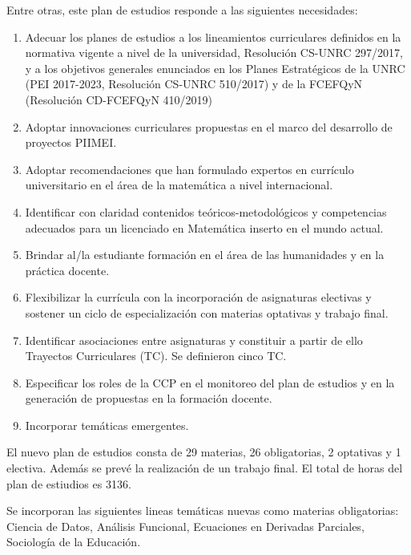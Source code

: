 \documentclass[a4paper, 12pt]{article}
\begin{document}
Entre otras, este plan de estudios responde a las siguientes necesidades:

\begin{enumerate}
 \item Adecuar los planes de estudios a los  lineamientos curriculares definidos en la normativa vigente a nivel de la universidad, Resolución CS-UNRC 297/2017, y a los objetivos generales enunciados en   los Planes Estratégicos de la UNRC (PEI 2017-2023, Resolución CS-UNRC 510/2017) y de la FCEFQyN (Resolución CD-FCEFQyN 410/2019)
 \item Adoptar innovaciones curriculares propuestas en el marco del desarrollo de proyectos PIIMEI.

 \item Adoptar recomendaciones que han formulado expertos en currículo universitario en el área de la matemática a nivel internacional.
 
 \item Identificar con claridad  contenidos teóricos-metodológicos y  competencias  adecuados para un  licenciado en Matemática inserto en el mundo actual.
 
 \item Brindar al/la estudiante formación en el área de las humanidades y en la práctica docente.
 
 \item Flexibilizar la currícula con la incorporación de asignaturas electivas y sostener un ciclo de especialización con materias optativas y trabajo final.
 
 \item Identificar asociaciones entre asignaturas y constituir a partir de ello  Trayectos Curriculares (TC). Se definieron cinco TC.
 
 \item Especificar los roles de la CCP en el monitoreo del plan de estudios y en la generación de propuestas en la formación docente. 
 
 \item Incorporar temáticas emergentes. 
 
 
\end{enumerate}

 
 El nuevo plan de estudios consta de 29 materias, 26 obligatorias,   2 optativas y 1 electiva. Además se prevé la realización de un trabajo final. El total de horas del plan de estiudios es 3136.
 
 Se incorporan las siguientes lineas temáticas nuevas como materias obligatorias: Ciencia de Datos, Análisis Funcional, Ecuaciones en Derivadas Parciales, Sociología de la Educación.
 
\end{document}
